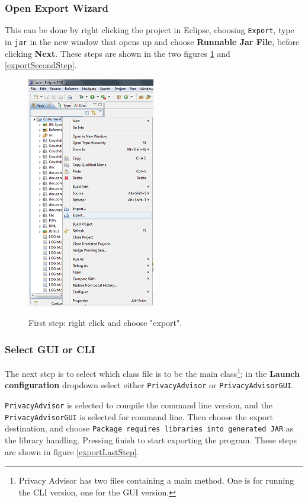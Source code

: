 \subsubsection{Open Export Wizard}
This can be done by right clicking the project in Eclipse, choosing \texttt{Export}, type in \texttt{jar} in the new window that opens up and choose \textbf{Runnable Jar File}, before clicking \textbf{Next}. These steps are shown in the two figures \ref{exportFirstStep} and \ref{exportSecondStep}.

\begin{figure}
  \vspace{-10pt}
  \begin{centering}
    \includegraphics[width = .38\textwidth]{Documentation/export.png}
    \vspace{-10pt}
    \caption{First step: right click and choose "export".}
    \vspace{-10pt}
    \label{exportFirstStep}
    \end{centering}
  \end{figure}

  \subsubsection{Select GUI or CLI}
  The next step is to select which class file is to be the main class\footnote{Privacy Advisor has two files containing a main method. One is for running the CLI version, one for the GUI version.}; in the \textbf{Launch configuration} dropdown select either \texttt{PrivacyAdvisor} or \texttt{PrivacyAdvisorGUI}.

\texttt{PrivacyAdvisor} is selected to compile the command line version, and the \texttt{PrivacyAdvisorGUI} is selected for command line. Then choose the export destination, and choose \texttt{Package requires libraries into generated JAR} as the library handling. Pressing finish to start exporting the program. These steps are shown in figure \ref{exportLastStep}.


